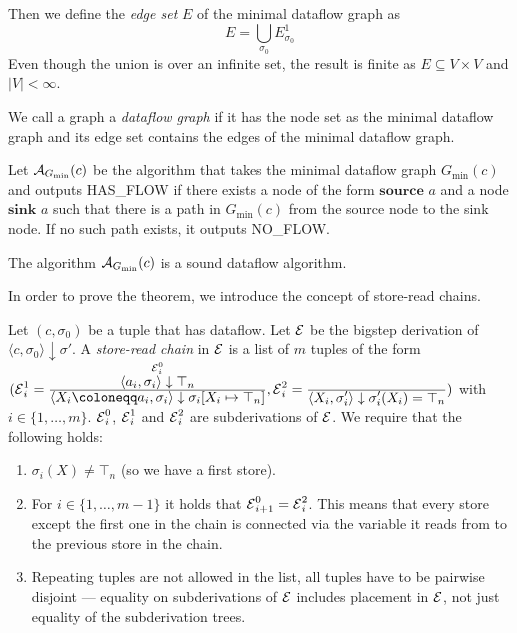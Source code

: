 Then we define the \emph{edge set} $E$ of the minimal dataflow graph as
\begin{equation*}
    E = \bigcup_{\sigma_0} E^1_{\sigma_0}
\end{equation*}
Even though the union is over an infinite set, the result is finite
as $E \subseteq V \times V$ and $|V| < \infty$.

We call a graph a \emph{dataflow graph} if it has the node set as the minimal
dataflow graph and its edge set contains the edges of the minimal dataflow 
graph.

Let $\operatorname{\mathcal{A}}_{G_\text{min}}(c)$ be the algorithm that takes the
minimal dataflow graph $G_\text{min}(c)$ and outputs HAS\_FLOW if there 
exists a node of the form 
$\textbf{source }a$ and a node $\textbf{sink }a$ such that there is a path in 
$G_\text{min}(c)$ from the source node to the sink node.
If no such path exists, it outputs NO\_FLOW.


\begin{theorem}
    \label{thm:min-dg}
    The algorithm $\operatorname{\mathcal{A}}_{G_\text{min}}(c)$ is a sound dataflow algorithm.
\end{theorem}
In order to prove the theorem, we introduce the concept of store-read chains.

\begin{definition}
    Let $(c, \sigma_0)$ be a tuple that has dataflow.
    Let $\operatorname{\mathcal{E}}$ be the bigstep derivation of
    $\langle c, \sigma_0 \rangle \downarrow \sigma'$.
    A \emph{store-read chain} in $\operatorname{\mathcal{E}}$ is a list of $m$ tuples of the form
    $(\E^1_i=\ddfrac{\overset{\E^0_i}{\langle a_i, \sigma_i \rangle \downarrow \top_n}}
    {\langle X_i \coloneqq a_i, \sigma_i \rangle \downarrow \sigma_i[X_i \mapsto \top_n]},
    \E^2_i=\ddfrac{}{\langle X_i, \sigma_i' \rangle \downarrow \sigma_i'(X_i) = \top_n})$
    with $i \in \{1, \ldots, m\}$.
    $\operatorname{\mathcal{E}}^0_i$, $\operatorname{\mathcal{E}}^1_i$ and $\operatorname{\mathcal{E}}^2_i$ are subderivations of $\operatorname{\mathcal{E}}$.
    We require that the following holds:
    \begin{enumerate}
        \item $\sigma_i(X) \neq \top_n$ (so we have a first store). 
        \item For $i \in \{1, \ldots, m-1\}$ it holds that 
        $\operatorname{\mathcal{E}}^0_{i+1}=\operatorname{\mathcal{E}}^2_i$. This means that every store except the first one
        in the chain is connected via the variable it reads from to the previous 
        store in the chain.
        \item Repeating tuples are not allowed in the list, all tuples have to 
        be pairwise disjoint --- equality on subderivations of $\operatorname{\mathcal{E}}$ includes
        placement in $\operatorname{\mathcal{E}}$, not just equality of the subderivation trees.
    \end{enumerate}
\end{definition}

